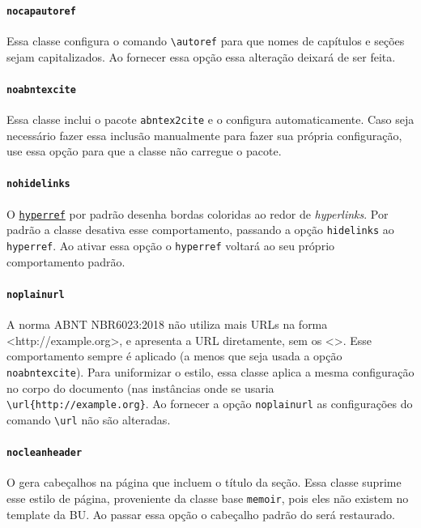 \documentclass[embeddedlogo]{ufsc-thesis-rn46-2019}
\newcommand{\lacmd}[1]{\texttt{\textbackslash{}#1}}
\begin{document}
\paragraph*{\texttt{nocapautoref}} Essa classe configura o comando
\lacmd{autoref} para que nomes de capítulos e seções sejam capitalizados. Ao
fornecer essa opção essa alteração deixará de ser feita.

\paragraph*{\texttt{noabntexcite}} Essa classe inclui o pacote
\texttt{abntex2cite} e o configura automaticamente. Caso seja necessário fazer
essa inclusão manualmente para fazer sua própria configuração, use essa opção
para que a classe não carregue o pacote.

\paragraph*{\texttt{nohidelinks}} O
\href{https://ctan.org/pkg/hyperref}{\texttt{hyperref}} por padrão desenha
bordas coloridas ao redor de \emph{hyperlinks}. Por padrão a classe desativa
esse comportamento, passando a opção \texttt{hidelinks} ao \texttt{hyperref}.
Ao ativar essa opção o \texttt{hyperref} voltará ao seu próprio comportamento
padrão.

\paragraph*{\texttt{noplainurl}} A norma ABNT NBR6023:2018 não utiliza mais URLs
na forma <http://example.org>, e apresenta a URL diretamente, sem os <>.  Esse
comportamento sempre é aplicado (a menos que seja usada a opção
\texttt{noabntexcite}). Para uniformizar o estilo, essa classe aplica a mesma
configuração no corpo do documento (nas instâncias onde se usaria
\lacmd{url\{http://example.org\}}. Ao fornecer a opção \texttt{noplainurl} as
configurações do comando \lacmd{url} não são alteradas.


\paragraph*{\texttt{nocleanheader}} O \abnTeX{} gera cabeçalhos na página que
incluem o título da seção. Essa classe suprime esse estilo de página,
proveniente da classe base \texttt{memoir}, pois eles não existem no template
da BU. Ao passar essa opção o cabeçalho padrão do \abnTeX{} será restaurado.
\end{document}
